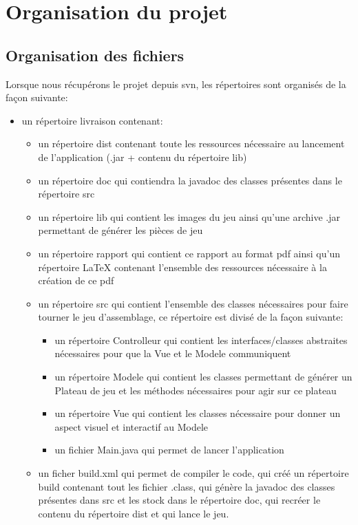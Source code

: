 \documentclass[12pt]{article}
\begin{document}
\section{Organisation du projet}

\subsection{Organisation des fichiers}

Lorsque nous récupérons le projet depuis svn, les répertoires sont organisés de la façon suivante:

\begin{small}
\begin{itemize}
	\item un répertoire livraison contenant:
	\begin{itemize}
		\item un répertoire dist contenant toute les ressources nécessaire au lancement de l'application (.jar + contenu du répertoire lib)
		\item un répertoire doc qui contiendra la javadoc des classes présentes dans le répertoire src
		\item un répertoire lib qui contient les images du jeu ainsi qu'une archive .jar permettant de générer les pièces de jeu
		\item un répertoire rapport qui contient ce rapport au format pdf ainsi qu'un répertoire LaTeX contenant l'ensemble des ressources nécessaire à la création de ce pdf
		\item un répertoire src qui contient l'ensemble des classes nécessaires pour faire tourner le jeu d'assemblage, ce répertoire est divisé de la façon suivante:
		\begin{itemize}
			\item un répertoire Controlleur qui contient les interfaces/classes abstraites nécessaires pour que la Vue et le Modele communiquent
			\item un répertoire Modele qui contient les classes permettant de générer un Plateau de jeu et les méthodes nécessaires pour agir sur ce plateau
			\item un répertoire Vue qui contient les classes nécessaire pour donner un aspect visuel et interactif au Modele
			\item un fichier Main.java qui permet de lancer l'application 
		\end{itemize}
		\item un ficher build.xml qui permet de compiler le code, qui créé un répertoire build contenant tout les fichier .class, qui génère la javadoc des classes présentes dans src et les stock dans le répertoire doc, qui recréer le contenu du répertoire dist et qui lance le jeu.

\end{itemize}
\end{itemize}
\end{small}
\end{document}
